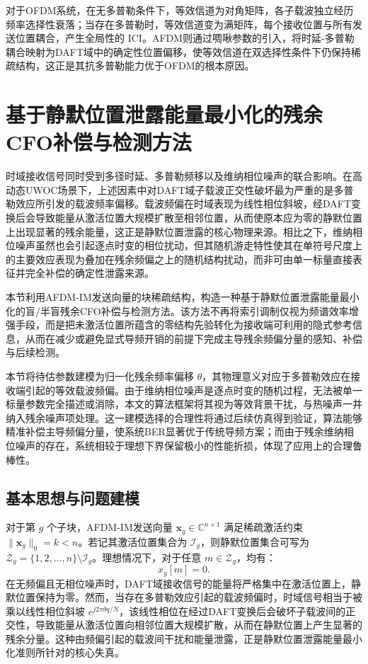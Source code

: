 对于OFDM系统，在无多普勒条件下，等效信道为对角矩阵，各子载波独立经历频率选择性衰落；当存在多普勒时，等效信道变为满矩阵，每个接收位置与所有发送位置耦合，产生全局性的 ICI。AFDM则通过啁啾参数的引入，将时延-多普勒耦合映射为DAFT域中的确定性位置偏移，使等效信道在双选择性条件下仍保持稀疏结构，这正是其抗多普勒能力优于OFDM的根本原因。

\section{基于静默位置泄露能量最小化的残余CFO补偿与检测方法}
\label{sec:silent_leakage_phase_comp}

时域接收信号同时受到多径时延、多普勒频移以及维纳相位噪声的联合影响。在高动态UWOC场景下，上述因素中对DAFT域子载波正交性破坏最为严重的是多普勒效应所引发的载波频率偏移。载波频偏在时域表现为线性相位斜坡，经DAFT变换后会导致能量从激活位置大规模扩散至相邻位置，从而使原本应为零的静默位置上出现显著的残余能量，这正是静默位置泄露的核心物理来源。相比之下，维纳相位噪声虽然也会引起逐点时变的相位扰动，但其随机游走特性使其在单符号尺度上的主要效应表现为叠加在残余频偏之上的随机结构扰动，而非可由单一标量直接表征并完全补偿的确定性泄露来源。

本节利用AFDM-IM发送向量的块稀疏结构，构造一种基于静默位置泄露能量最小化的盲/半盲残余CFO补偿与检测方法。该方法不再将索引调制仅视为频谱效率增强手段，而是把未激活位置所蕴含的零结构先验转化为接收端可利用的隐式参考信息，从而在减少或避免显式导频开销的前提下完成主导残余频偏分量的感知、补偿与后续检测。

本节将待估参数建模为归一化残余频率偏移 $\theta$，其物理意义对应于多普勒效应在接收端引起的等效载波频偏。由于维纳相位噪声是逐点时变的随机过程，无法被单一标量参数完全描述或消除，本文的算法框架将其视为等效背景干扰，与热噪声一并纳入残余噪声项处理。这一建模选择的合理性将通过后续仿真得到验证，算法能够精准补偿主导频偏分量，使系统BER显著优于传统导频方案；而由于残余维纳相位噪声的存在，系统相较于理想下界保留极小的性能折损，体现了应用上的合理鲁棒性。

\subsection{基本思想与问题建模}
\label{subsec:silent_leakage_principle}

对于第 $g$ 个子块，AFDM-IM发送向量 $\mathbf{x}_g\in\mathbb{C}^{n\times 1}$ 满足稀疏激活约束 $\|\mathbf{x}_g\|_0=k<n$。若记其激活位置集合为 $\mathcal{I}_g$，则静默位置集合可写为 $\mathcal{Z}_g=\{1,2,\ldots,n\}\setminus\mathcal{I}_g$。理想情况下，对于任意 $m\in\mathcal{Z}_g$，均有：
\begin{equation}
    x_g[m]=0.
\end{equation}
在无频偏且无相位噪声时，DAFT域接收信号的能量将严格集中在激活位置上，静默位置保持为零。然而，当存在多普勒效应引起的载波频偏时，时域信号相当于被乘以线性相位斜坡 $e^{j2\pi\theta q/N}$，该线性相位在经过DAFT变换后会破坏子载波间的正交性，导致能量从激活位置向相邻位置大规模扩散，从而在静默位置上产生显著的残余分量。这种由频偏引起的载波间干扰和能量泄露，正是静默位置泄露能量最小化准则所针对的核心失真。

